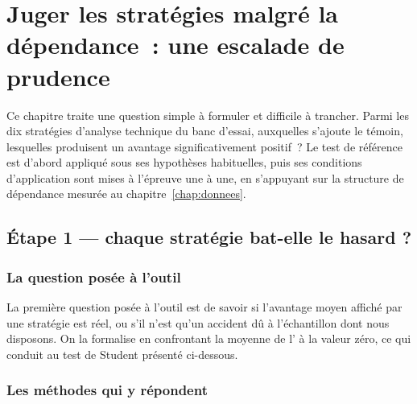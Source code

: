 \chapter{Juger les stratégies malgré la dépendance~: une escalade de prudence}
\label{chap:juger}
\label{chap:bloc1} %

Ce chapitre traite une question simple à formuler et difficile à trancher.
Parmi les dix stratégies d'analyse technique du banc d'essai, auxquelles
s'ajoute le témoin, lesquelles produisent un avantage significativement
positif~? Le test de référence est d'abord appliqué sous ses hypothèses
habituelles, puis ses conditions d'application sont mises à l'épreuve une à
une, en s'appuyant sur la structure de dépendance mesurée au
chapitre~\ref{chap:donnees}.

\section{Étape 1 --- chaque stratégie bat-elle le hasard ?}
\label{sec:b1-etape1}

\subsection{La question posée à l'outil}

La première question posée à l'outil est de savoir si l'avantage moyen
affiché par une stratégie est réel, ou s'il n'est qu'un accident dû à
l'échantillon dont nous disposons. On la formalise en confrontant la moyenne
de l'\edgevar{} à la valeur zéro, ce qui conduit au test de Student présenté
ci-dessous.

\subsection{Les méthodes qui y répondent}

